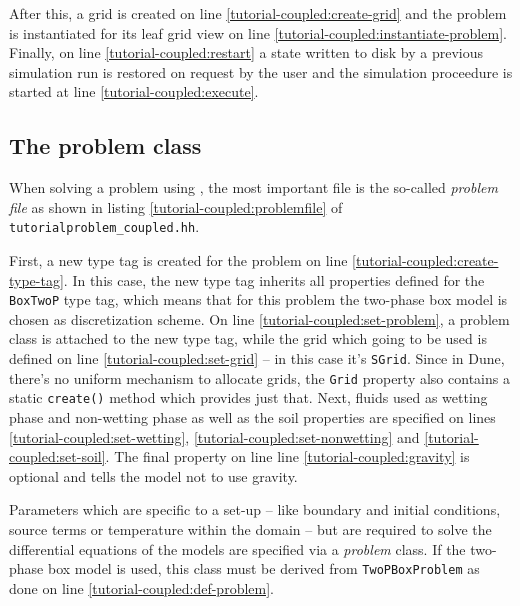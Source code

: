 After this, a grid is created on line
\ref{tutorial-coupled:create-grid} and the problem is instantiated for
its leaf grid view on line \ref{tutorial-coupled:instantiate-problem}.
Finally, on line \ref{tutorial-coupled:restart} a state written to
disk by a previous simulation run is restored on request by the user
and the simulation proceedure is started at line
\ref{tutorial-coupled:execute}.

\subsection{The problem class}

When solving a problem using \Dumux, the most important file is the
so-called \textit{problem file} as shown in listing
\ref{tutorial-coupled:problemfile} of
\texttt{tutorialproblem\_coupled.hh}.

\begin{lst}\label{tutorial-coupled:problemfile} \mbox{}

\end{lst}

First, a new type tag is created for the problem on line
\ref{tutorial-coupled:create-type-tag}.  In this case, the new type
tag inherits all properties defined for the \texttt{BoxTwoP} type tag,
which means that for this problem the two-phase box model is chosen as
discretization scheme. On line \ref{tutorial-coupled:set-problem}, a
problem class is attached to the new type tag, while the grid which
going to be used is defined on line \ref{tutorial-coupled:set-grid} --
in this case it's \texttt{SGrid}.  Since in Dune, there's no uniform
mechanism to allocate grids, the \texttt{Grid} property also contains
a static \texttt{create()} method which provides just that. Next,
fluids used as wetting phase and non-wetting phase as well as the soil
properties are specified on lines \ref{tutorial-coupled:set-wetting},
\ref{tutorial-coupled:set-nonwetting} and
\ref{tutorial-coupled:set-soil}. The final property on line line
\ref{tutorial-coupled:gravity} is optional and tells the model not to
use gravity.

Parameters which are specific to a set-up -- like boundary and initial
conditions, source terms or temperature within the domain -- but are
required to solve the differential equations of the models are
specified via a \textit{problem} class. If the two-phase box model is
used, this class must be derived from \texttt{TwoPBoxProblem} as done
on line \ref{tutorial-coupled:def-problem}.

